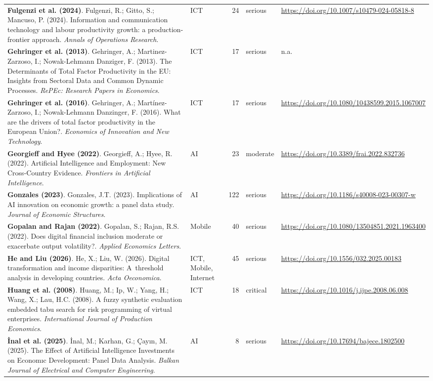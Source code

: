 {\begin{longtable}{@{}p{7.4cm} p{1.3cm} r l p{3.4cm}@{}}
\textbf{Fulgenzi et al. (2024)}. Fulgenzi, R.; Gitto, S.; Mancuso, P. (2024). Information and communication technology and labour productivity growth: a production-frontier approach. \emph{Annals of Operations Research}. & ICT & 24 & serious & \url{https://doi.org/10.1007/s10479-024-05818-8} \\
\textbf{Gehringer et al. (2013)}. Gehringer, A.; Martinez-Zarzoso, I.; Nowak-Lehmann Danziger, F. (2013). The Determinants of Total Factor Productivity in the EU: Insights from Sectoral Data and Common Dynamic Processes. \emph{RePEc: Research Papers in Economics}. & ICT & 17 & serious & n.a. \\
\textbf{Gehringer et al. (2016)}. Gehringer, A.; Martínez-Zarzoso, I.; Nowak-Lehmann Danzinger, F. (2016). What are the drivers of total factor productivity in the European Union?. \emph{Economics of Innovation and New Technology}. & ICT & 17 & serious & \url{https://doi.org/10.1080/10438599.2015.1067007} \\
\textbf{Georgieff and Hyee (2022)}. Georgieff, A.; Hyee, R. (2022). Artificial Intelligence and Employment: New Cross-Country Evidence. \emph{Frontiers in Artificial Intelligence}. & AI & 23 & moderate & \url{https://doi.org/10.3389/frai.2022.832736} \\
\textbf{Gonzales (2023)}. Gonzales, J.T. (2023). Implications of AI innovation on economic growth: a panel data study. \emph{Journal of Economic Structures}. & AI & 122 & serious & \url{https://doi.org/10.1186/s40008-023-00307-w} \\
\textbf{Gopalan and Rajan (2022)}. Gopalan, S.; Rajan, R.S. (2022). Does digital financial inclusion moderate or exacerbate output volatility?. \emph{Applied Economics Letters}. & Mobile & 40 & serious & \url{https://doi.org/10.1080/13504851.2021.1963400} \\
\textbf{He and Liu (2026)}. He, X.; Liu, W. (2026). Digital transformation and income disparities: A threshold analysis in developing countries. \emph{Acta Oeconomica}. & ICT, Mobile, Internet & 45 & serious & \url{https://doi.org/10.1556/032.2025.00183} \\
\textbf{Huang et al. (2008)}. Huang, M.; Ip, W.; Yang, H.; Wang, X.; Lau, H.C. (2008). A fuzzy synthetic evaluation embedded tabu search for risk programming of virtual enterprises. \emph{International Journal of Production Economics}. & ICT & 18 & critical & \url{https://doi.org/10.1016/j.ijpe.2008.06.008} \\
\textbf{İnal et al. (2025)}. İnal, M.; Karhan, G.; Çayın, M. (2025). The Effect of Artificial Intelligence Investments on Economıc Development: Panel Data Analysis. \emph{Balkan Journal of Electrical and Computer Engineering}. & AI & 8 & serious & \url{https://doi.org/10.17694/bajece.1802500} \\

\end{longtable}}
